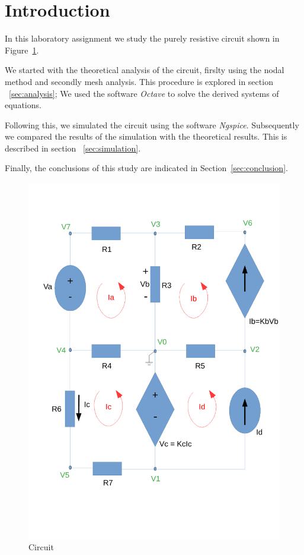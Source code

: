\section{Introduction}
\label{sec:introduction}

In this laboratory assignment we study the purely resistive circuit 
shown in Figure~\ref{fig:circuit}.

We started with the theoretical analysis of the circuit, 
firslty using the nodal method and secondly mesh analysis. 
This procedure is explored in section ~\ref{sec:analysis};
We used the software \textit{Octave} to solve the derived systems of equations.

Following this, we simulated the circuit using the software \textit{Ngspice}. 
Subsequently we compared the results of the simulation with the theoretical
results. This is described in section ~\ref{sec:simulation}.

Finally, the conclusions of this study are indicated in
Section~\ref{sec:conclusion}.

\begin{figure}[ht] \centering
    \includegraphics[width=0.4\linewidth]{circuito_tcfe.pdf}
    \caption{Circuit}
    \label{fig:circuit}
\end{figure}

